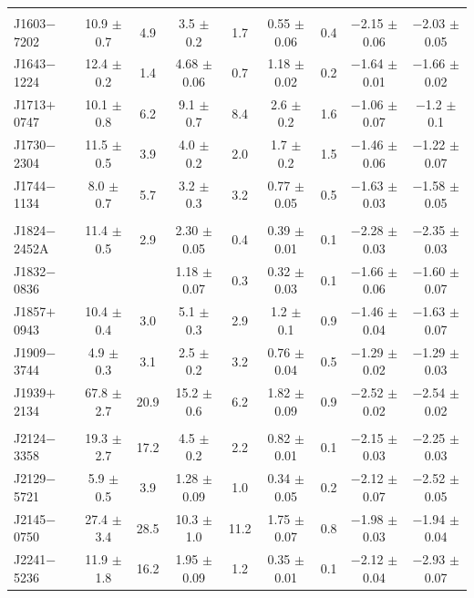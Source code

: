 \documentclass[useAMS,usenatbib]{mn2e}
\begin{document}
\begin{table}
\begin{tabular}{lcccccccc}
               &	                 &        &                   &       &                  &        &                     &                     \\   
 J1603$-$7202  &  10.9  $\pm$ 0.7  &  4.9   &  3.5   $\pm$ 0.2  &  1.7  &  0.55 $\pm$ 0.06 &  0.4   &  $-$2.15 $\pm$ 0.06 &  $-$2.03 $\pm$ 0.05 \\ 
 J1643$-$1224  &  12.4  $\pm$ 0.2  &  1.4   &  4.68  $\pm$ 0.06 &  0.7  &  1.18 $\pm$ 0.02 &  0.2   &  $-$1.64 $\pm$ 0.01 &  $-$1.66 $\pm$ 0.02 \\ 
 J1713$+$0747  &  10.1  $\pm$ 0.8  &  6.2   &  9.1   $\pm$ 0.7  &  8.4  &  2.6  $\pm$ 0.2  &  1.6   &  $-$1.06 $\pm$ 0.07 &  $-$1.2  $\pm$ 0.1 \\ 
 J1730$-$2304  &  11.5  $\pm$ 0.5  &  3.9   &  4.0   $\pm$ 0.2  &  2.0  &  1.7  $\pm$ 0.2  &  1.5   &  $-$1.46 $\pm$ 0.06 &  $-$1.22 $\pm$ 0.07 \\ 
 J1744$-$1134  &  8.0   $\pm$ 0.7  &  5.7   &  3.2   $\pm$ 0.3  &  3.2  &  0.77 $\pm$ 0.05 &  0.5   &  $-$1.63 $\pm$ 0.03 &  $-$1.58 $\pm$ 0.05 \\ 
               &	                 &        &                   &       &                  &        &                     &                     \\  
 J1824$-$2452A &  11.4  $\pm$ 0.5  &  2.9   &  2.30  $\pm$ 0.05 &  0.4  &  0.39 $\pm$ 0.01 &  0.1   &  $-$2.28 $\pm$ 0.03 &  $-$2.35 $\pm$ 0.03 \\ 
 J1832$-$0836  &	                 &        &  1.18  $\pm$ 0.07 &  0.3  &  0.32 $\pm$ 0.03 &  0.1   &  $-$1.66 $\pm$ 0.06 &  $-$1.60 $\pm$ 0.07 \\ 
 J1857$+$0943  &  10.4  $\pm$ 0.4  &  3.0   &  5.1   $\pm$ 0.3  &  2.9  &  1.2  $\pm$ 0.1  &  0.9   &  $-$1.46 $\pm$ 0.04 &  $-$1.63 $\pm$ 0.07 \\ 
 J1909$-$3744  &  4.9   $\pm$ 0.3  &  3.1   &  2.5   $\pm$ 0.2  &  3.2  &  0.76 $\pm$ 0.04 &  0.5   &  $-$1.29 $\pm$ 0.02 &  $-$1.29 $\pm$ 0.03 \\ 
 J1939$+$2134  &  67.8  $\pm$ 2.7  &  20.9  &  15.2  $\pm$ 0.6  &  6.2  &  1.82 $\pm$ 0.09 &  0.9   &  $-$2.52 $\pm$ 0.02 &  $-$2.54 $\pm$ 0.02 \\ 
               &	                 &        &                   &       &                  &        &                     &                     \\   
 J2124$-$3358  &  19.3  $\pm$ 2.7  &  17.2  &  4.5   $\pm$ 0.2  &  2.2  &  0.82 $\pm$ 0.01 &  0.1   &  $-$2.15 $\pm$ 0.03 &  $-$2.25 $\pm$ 0.03 \\ 
 J2129$-$5721  &  5.9   $\pm$ 0.5  &  3.9   &  1.28  $\pm$ 0.09 &  1.0  &  0.34 $\pm$ 0.05 &  0.2   &  $-$2.12 $\pm$ 0.07 &  $-$2.52 $\pm$ 0.05 \\ 
 J2145$-$0750  &  27.4  $\pm$ 3.4  &  28.5  &  10.3  $\pm$ 1.0  &  11.2 &  1.75 $\pm$ 0.07 &  0.8   &  $-$1.98 $\pm$ 0.03 &  $-$1.94 $\pm$ 0.04 \\ 
 J2241$-$5236  &  11.9  $\pm$ 1.8  &  16.2  &  1.95  $\pm$ 0.09 &  1.2  &  0.35 $\pm$ 0.01 &  0.1   &  $-$2.12 $\pm$ 0.04 &  $-$2.93 $\pm$ 0.07 \\ 
\hline
\end{tabular}
\end{table}
\end{document}
